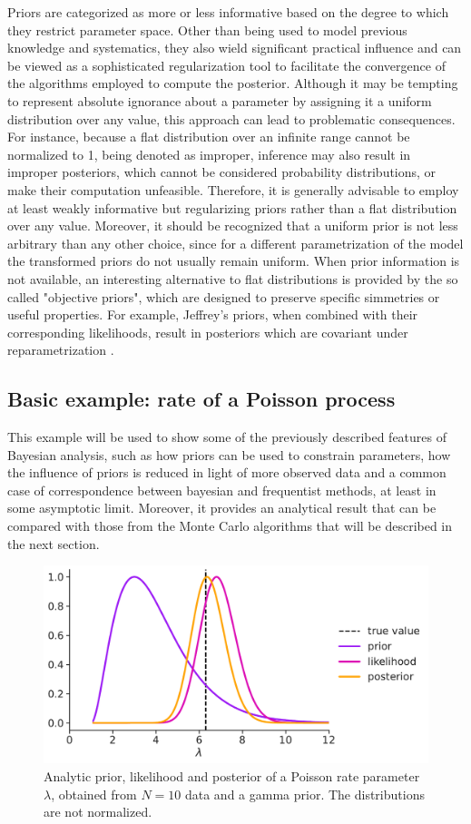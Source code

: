 Priors are categorized as more or less informative based on the degree to which they restrict parameter space. 
Other than being used to model previous knowledge and systematics, they also wield significant practical influence and
can be viewed as a sophisticated regularization tool to facilitate the convergence of the algorithms employed to compute the
posterior.  Although it may be tempting to represent absolute ignorance about a parameter by assigning it a
uniform distribution over any value, this approach can lead to problematic consequences. For instance, because a flat
distribution over an infinite range cannot be normalized to 1, being denoted as improper, inference may also result in
improper posteriors, which cannot be considered probability distributions, or make their computation
unfeasible. Therefore, it is generally advisable to employ at least weakly informative but regularizing priors rather than a flat
distribution over any value. Moreover, it should be recognized that a uniform prior
is not less arbitrary than any other choice, since for a different parametrization of the model the transformed priors
do not usually remain uniform. When prior information is not available, an interesting alternative to flat distributions
is provided by the so called "objective priors", which are designed to preserve specific simmetries or useful
properties. For example, Jeffrey's priors, when combined with their corresponding likelihoods, result in posteriors
which are covariant under reparametrization \cite{objective}.
\subsection{Basic example: rate of a Poisson process}\label{sec:example}
This example will be used to show some of the previously described features of Bayesian analysis, such as how priors
can be used to constrain parameters, how the influence of priors is reduced in light of more observed data and a common
case of correspondence between bayesian and frequentist methods, at least in some asymptotic limit. Moreover, it
provides an analytical result that can be compared with those from the Monte Carlo algorithms that will be described in the next section.
\begin{figure}[t]
    \centering
    \includegraphics[width=0.9\linewidth]{figures/ch2/poisson/pdf_0.pdf}
    \caption{Analytic prior, likelihood and posterior of a Poisson rate parameter $\lambda$, obtained from $N=10$ data and a gamma prior. The distributions are not normalized.}
    \label{fig:poisexact}
\end{figure}

